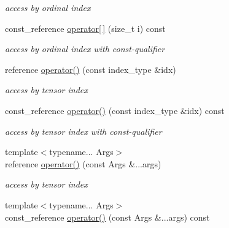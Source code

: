 \begin{DoxyCompactItemize}
\begin{DoxyCompactList}\small\item\em access by ordinal index \item\end{DoxyCompactList}\item 
\hypertarget{classbtas_1_1_tensor_view_ac0b9cd1e25844b96d24788acbf294749}{
const\_\-reference \hyperlink{classbtas_1_1_tensor_view_ac0b9cd1e25844b96d24788acbf294749}{operator\mbox{[}$\,$\mbox{]}} (size\_\-t i) const }
\label{classbtas_1_1_tensor_view_ac0b9cd1e25844b96d24788acbf294749}

\begin{DoxyCompactList}\small\item\em access by ordinal index with const-\/qualifier \item\end{DoxyCompactList}\item 
\hypertarget{classbtas_1_1_tensor_view_a0f7391759c6c1d172828afa34a1bb086}{
reference \hyperlink{classbtas_1_1_tensor_view_a0f7391759c6c1d172828afa34a1bb086}{operator()} (const index\_\-type \&idx)}
\label{classbtas_1_1_tensor_view_a0f7391759c6c1d172828afa34a1bb086}

\begin{DoxyCompactList}\small\item\em access by tensor index \item\end{DoxyCompactList}\item 
\hypertarget{classbtas_1_1_tensor_view_a5008822d7c886d0d6a020ae82d51b72c}{
const\_\-reference \hyperlink{classbtas_1_1_tensor_view_a5008822d7c886d0d6a020ae82d51b72c}{operator()} (const index\_\-type \&idx) const }
\label{classbtas_1_1_tensor_view_a5008822d7c886d0d6a020ae82d51b72c}

\begin{DoxyCompactList}\small\item\em access by tensor index with const-\/qualifier \item\end{DoxyCompactList}\item 
\hypertarget{classbtas_1_1_tensor_view_a0dc6feb8e0e842226b4e3a6932491474}{
{\footnotesize template$<$typename... Args$>$ }\\reference \hyperlink{classbtas_1_1_tensor_view_a0dc6feb8e0e842226b4e3a6932491474}{operator()} (const Args \&...args)}
\label{classbtas_1_1_tensor_view_a0dc6feb8e0e842226b4e3a6932491474}

\begin{DoxyCompactList}\small\item\em access by tensor index \item\end{DoxyCompactList}\item 
\hypertarget{classbtas_1_1_tensor_view_a37e630b3461ba4dce394f613fb1ac3a3}{
{\footnotesize template$<$typename... Args$>$ }\\const\_\-reference \hyperlink{classbtas_1_1_tensor_view_a37e630b3461ba4dce394f613fb1ac3a3}{operator()} (const Args \&...args) const }
\label{classbtas_1_1_tensor_view_a37e630b3461ba4dce394f613fb1ac3a3}


\end{DoxyCompactItemize}
